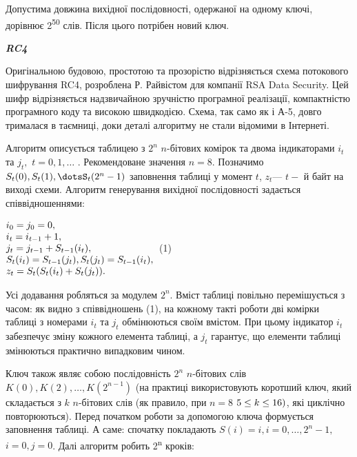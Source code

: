 Допустима довжина вихідної послідовності, одержаної на одному ключі, дорівнює
2\textsuperscript{50 } слів. Після цього потрібен новий ключ.


\bigskip

{\centering\bfseries\itshape
RC4
\par}


\bigskip

Оригінальною будовою, простотою та прозорістю відрізняється схема потокового
шифрування RC4, розроблена Р. Райвістом для компанії RSA Data Security. Цей
шифр відрізняється надзвичайною зручністю програмної реалізації, компактністю
програмного коду та високою швидкодією. Схема, так само як і А-5, довго
трималася в таємниці, доки деталі алгоритму не стали відомими в Інтернеті. 

Алгоритм описується  таблицею з  $2^n$   $n${}-бітових комірок та двома
індикаторами  $i_t$ та  $j_t,$  $t=0,1,\dots$
. Рекомендоване значення  $n=8\text{.}$ Позначимо  
$S_{t}(0),S_{t}(1),\dotsS_{t}(2^n-1)$ заповнення
таблиці у момент  $t$,  $z_t$---  $t-$ й байт на виході схеми. 
Алгоритм генерування вихідної послідовності задається співвідношеннями:


\bigskip

{\centering
  $\begin{matrix}{i_{0}=j_{0}=0,}\hfill\null
\\i_{t}=i_{t-1}+1,\hfill\null
\\j_{t}=j_{t-1}+S_{t-1}(i_{t}),\hfill\null
\\S_{t}(i_{t})=S_{t-1}(j_{t}),S_{t}(j_{t})=S_{t-1}(i_{t}),\hfill\null
\\z_{t}=S_{t}(S_{t}(i_{t})+S_{t}(j_{t}))\text{.}\hfill\null
\end{matrix}\hfill $  (1)
\par}


\bigskip

Усі додавання робляться за модулем  $2^n$. Вміст таблиці повільно
перемішується з часом: як видно з співвідношень (1), на кожному такті роботи
дві комірки таблиці з номерами  $i_t$ та  $j_t$ обмінюються своїм
вмістом. При цьому індикатор  $i_t$ забезпечує зміну кожного елемента
таблиці, а  $j_t$ гарантує, що елементи таблиці змінюються практично
випадковим чином.

Ключ також  являє собою послідовність  $2^n$   $n${}-бітових слів 
$K(0),K(2),\dots,K(2^{n-1})$ (на практиці використовують
коротший ключ, який складається з  $k$ $n${}-бітових слів (як правило, при 
$n=8$  $5\le k\le \text16)$, які циклічно повторюються). Перед початком
роботи за допомогою ключа формується заповнення таблиці. А саме: спочатку
покладають  $S(i)=i,i=0,\dots,2^n-1,$  $i=0,j=0$.
Далі алгоритм робить 2\textsuperscript{n} кроків: 

